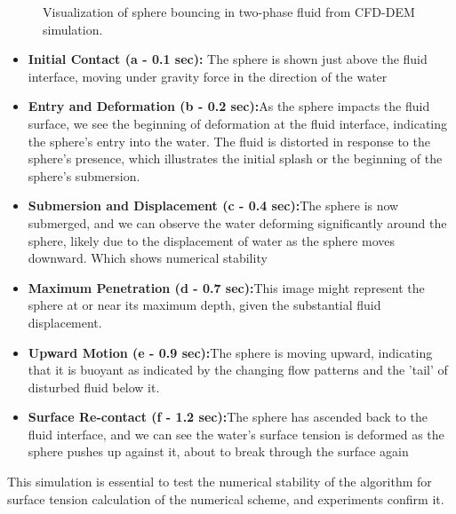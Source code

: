 \begin{figure}[H]
\begin{minipage}{.4\textwidth}
    \end{minipage}
    \caption{Visualization of sphere bouncing in two-phase fluid from CFD-DEM simulation.}
    \label{fig:two-phase_sphere}
\end{figure}
\begin{itemize}
    \item \textbf{Initial Contact (a - 0.1 sec):} The sphere is shown just above the fluid interface, moving under gravity force in the direction of the water
    \item \textbf{Entry and Deformation (b - 0.2 sec):}As the sphere impacts the fluid surface, we see the beginning of deformation at the fluid interface, indicating the sphere's entry into the water. The fluid is distorted in response to the sphere's presence, which illustrates the initial splash or the beginning of the sphere's submersion.
    \item \textbf{Submersion and Displacement (c - 0.4 sec):}The sphere is now submerged, and we can observe the water deforming significantly around the sphere, likely due to the displacement of water as the sphere moves downward. Which shows numerical stability
    \item \textbf{Maximum Penetration (d - 0.7 sec):}This image might represent the sphere at or near its maximum depth, given the substantial fluid displacement.
    \item \textbf{Upward Motion (e - 0.9 sec):}The sphere is moving upward, indicating that it is buoyant as indicated by the changing flow patterns and the 'tail' of disturbed fluid below it.
    \item \textbf{Surface Re-contact (f - 1.2 sec):}The sphere has ascended back to the fluid interface, and we can see the water's surface tension is deformed as the sphere pushes up against it, about to break through the surface again
\end{itemize}

This simulation is essential to test the numerical stability of the algorithm for surface tension calculation of the numerical scheme, and experiments confirm it.

